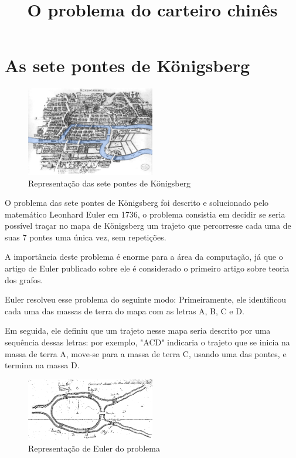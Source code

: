 \documentclass{article}
\title{O problema do carteiro chinês}
\date{}
\begin{document}
\maketitle

\section{As sete pontes de Königsberg}

\begin{figure} 
    \centering
    \includegraphics[width=0.5\textwidth]{konigsberg.png}
    \caption{Representação das sete pontes de Königsberg}
\end{figure}
O problema das sete pontes de Königsberg foi descrito e solucionado pelo matemático Leonhard Euler em 1736, o problema consistia em decidir se seria possível traçar no mapa de Königsberg um trajeto que percorresse cada uma de suas 7 pontes uma única vez, sem repetições.

A importância deste problema é enorme para a área da computação, já que o artigo de Euler publicado sobre ele é considerado o primeiro artigo sobre teoria dos grafos.

Euler resolveu esse problema do seguinte modo: 
Primeiramente, ele identificou cada uma das massas de terra do mapa com as letras A, B, C e D.

Em seguida, ele definiu que um trajeto nesse mapa seria descrito por uma sequência dessas letras: por exemplo, "ACD" indicaria o trajeto que se inicia na massa de terra A, move-se para a massa de terra C, usando uma das pontes, e termina na massa D.

\begin{figure} 
    \centering
    \includegraphics[width=0.5\textwidth]{konigsberg-euler.png}
    \caption{Representação de Euler do problema}
	\label{konigsberg-euler}
\end{figure}
\end{document}
